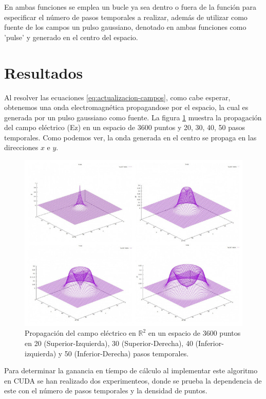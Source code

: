 \documentclass[11pt,a4paper,twoside,pdf]{article}
\numberwithin{equation}{section}
\begin{document}
En ambas funciones se emplea un bucle ya sea dentro o fuera de la función para especificar el número de pasos temporales a realizar, además de utilizar como fuente de los campos un pulso gaussiano, denotado en ambas funciones como 'pulse' y generado en el centro del espacio.





\section{Resultados}

Al resolver las ecuaciones \ref{eq:actualizacion-campos}, como cabe esperar, obtenemos una onda electromagnética propagandose por el espacio, la cual es generada por un pulso gaussiano como fuente. La figura \ref{fig:solucion} muestra la propagación del campo eléctrico (Ez) en un espacio de 3600 puntos y 20, 30, 40, 50 pasos temporales. Como podemos ver, la onda generada en el centro se propaga en las direcciones $x$ e $y$.  

\begin{figure}[h]
\centering
\includegraphics[width=15 cm]{Solution.JPG}				
\caption{Propagación del campo eléctrico en $\mathbb R^{2}$ en un espacio de 3600 puntos en 20 (Superior-Izquierda), 30 (Superior-Derecha), 40 (Inferior-izquierda) y 50 (Inferior-Derecha) pasos temporales.}
\label{fig:solucion}
\end{figure}
\noindent

Para determinar la ganancia en tíempo de cálculo al implementar este algoritmo en CUDA se han realizado dos experimenteos, donde se prueba la dependencia de este con el número de pasos temporales y la densidad de puntos.
\end{document}
